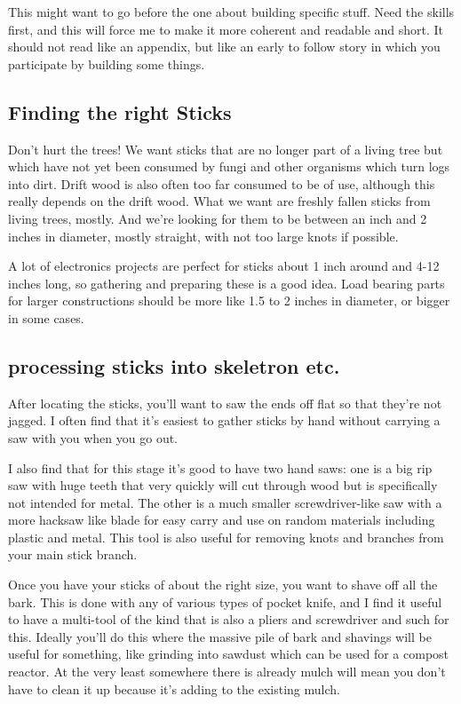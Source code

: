 This might want to go before the one about building specific stuff. Need
the skills first, and this will force me to make it more coherent and
readable and short. It should not read like an appendix, but like an
early to follow story in which you participate by building some things.

\subsection{Finding the right Sticks}\label{finding-the-right-sticks}

Don't hurt the trees! We want sticks that are no longer part of a living
tree but which have not yet been consumed by fungi and other organisms
which turn logs into dirt. Drift wood is also often too far consumed to
be of use, although this really depends on the drift wood. What we want
are freshly fallen sticks from living trees, mostly. And we're looking
for them to be between an inch and 2 inches in diameter, mostly
straight, with not too large knots if possible.

A lot of electronics projects are perfect for sticks about 1 inch around
and 4-12 inches long, so gathering and preparing these is a good idea.
Load bearing parts for larger constructions should be more like 1.5 to 2
inches in diameter, or bigger in some cases.

\subsection{processing sticks into skeletron
etc.}\label{processing-sticks-into-skeletron-etc.}

After locating the sticks, you'll want to saw the ends off flat so that
they're not jagged. I often find that it's easiest to gather sticks by
hand without carrying a saw with you when you go out.

I also find that for this stage it's good to have two hand saws: one is
a big rip saw with huge teeth that very quickly will cut through wood
but is specifically not intended for metal. The other is a much smaller
screwdriver-like saw with a more hacksaw like blade for easy carry and
use on random materials including plastic and metal. This tool is also
useful for removing knots and branches from your main stick branch.

Once you have your sticks of about the right size, you want to shave off
all the bark. This is done with any of various types of pocket knife,
and I find it useful to have a multi-tool of the kind that is also a
pliers and screwdriver and such for this. Ideally you'll do this where
the massive pile of bark and shavings will be useful for something, like
grinding into sawdust which can be used for a compost reactor. At the
very least somewhere there is already mulch will mean you don't have to
clean it up because it's adding to the existing mulch.

